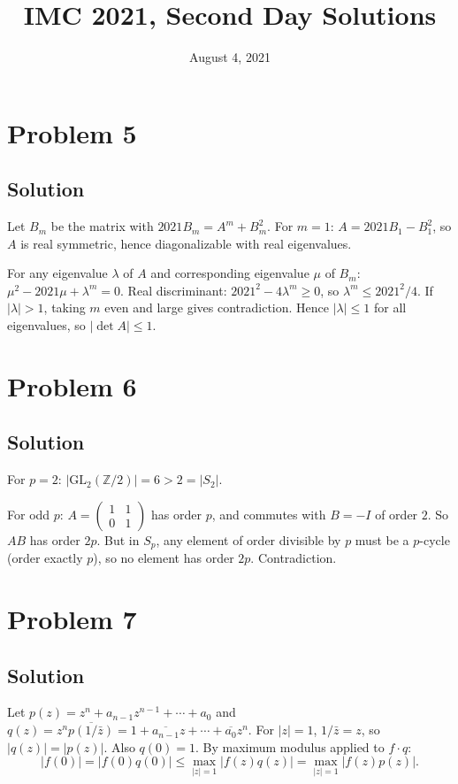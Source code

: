 \documentclass{article}
\title{IMC 2021, Second Day Solutions}
\date{August 4, 2021}
\begin{document}
\maketitle

\section*{Problem 5}
\subsection*{Solution}
Let $B_m$ be the matrix with $2021 B_m = A^m + B_m^2$. For $m = 1$: $A = 2021 B_1 - B_1^2$, so $A$ is real symmetric, hence diagonalizable with real eigenvalues.

For any eigenvalue $\lambda$ of $A$ and corresponding eigenvalue $\mu$ of $B_m$: $\mu^2 - 2021\mu + \lambda^m = 0$. Real discriminant: $2021^2 - 4\lambda^m \geq 0$, so $\lambda^m \leq 2021^2/4$. If $|\lambda| > 1$, taking $m$ even and large gives contradiction. Hence $|\lambda| \leq 1$ for all eigenvalues, so $|\det A| \leq 1$.

\section*{Problem 6}
\subsection*{Solution}
For $p = 2$: $|\mathrm{GL}_2(\mathbb{Z}/2)| = 6 > 2 = |S_2|$.

For odd $p$: $A = \begin{pmatrix} 1 & 1 \\ 0 & 1 \end{pmatrix}$ has order $p$, and commutes with $B = -I$ of order $2$. So $AB$ has order $2p$. But in $S_p$, any element of order divisible by $p$ must be a $p$-cycle (order exactly $p$), so no element has order $2p$. Contradiction.

\section*{Problem 7}
\subsection*{Solution}
Let $p(z) = z^n + a_{n-1} z^{n-1} + \cdots + a_0$ and $q(z) = z^n \overline{p(1/\bar z)} = 1 + \overline{a_{n-1}} z + \cdots + \overline{a_0} z^n$. For $|z| = 1$, $1/\bar z = z$, so $|q(z)| = |p(z)|$. Also $q(0) = 1$. By maximum modulus applied to $f \cdot q$:
\[ |f(0)| = |f(0) q(0)| \leq \max_{|z|=1} |f(z) q(z)| = \max_{|z|=1} |f(z) p(z)|. \]
\end{document}
